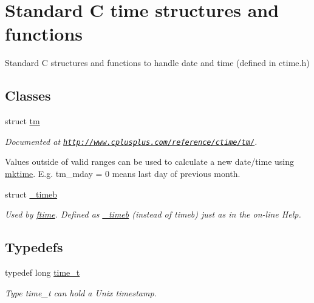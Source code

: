 \hypertarget{group__time}{\section{Standard C time structures and functions}
\label{group__time}
}


Standard C structures and functions to handle date and time (defined in ctime.\-h)  


\subsection*{Classes}
\begin{DoxyCompactItemize}
\item 
struct \hyperlink{structtm}{tm}
\begin{DoxyCompactList}\small\item\em Documented at \href{http://www.cplusplus.com/reference/ctime/tm/}{\tt http\-://www.\-cplusplus.\-com/reference/ctime/tm/}. \par
Values outside of valid ranges can be used to calculate a new date/time using \hyperlink{group__time_gae114b9ba0fce4e2d6297e0e66768bb75}{mktime}. E.\-g. tm\-\_\-mday = 0 means last day of previous month. \end{DoxyCompactList}\item 
struct \hyperlink{struct__timeb}{\-\_\-timeb}
\begin{DoxyCompactList}\small\item\em Used by \hyperlink{group__time_gafc0d3a1676a915f3cedcad79759f6802}{ftime}. Defined as \hyperlink{struct__timeb}{\-\_\-timeb} (instead of timeb) just as in the on-\/line Help. \end{DoxyCompactList}\end{DoxyCompactItemize}
\subsection*{Typedefs}
\begin{DoxyCompactItemize}
\item 
\hypertarget{group__time_ga824afaa48b313f905546cf45822800fc}{typedef long \hyperlink{group__time_ga824afaa48b313f905546cf45822800fc}{time\-\_\-t}}\label{group__time_ga824afaa48b313f905546cf45822800fc}

\begin{DoxyCompactList}\small\item\em Type time\-\_\-t can hold a Unix timestamp. \end{DoxyCompactList}\end{DoxyCompactItemize}
